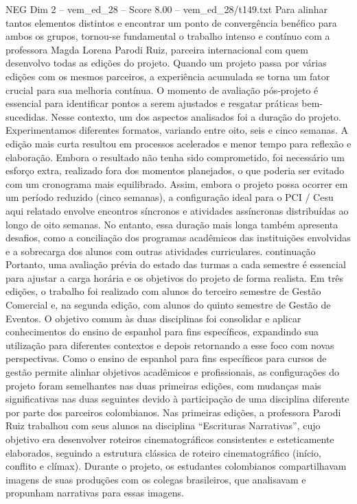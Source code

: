 \begin{textsample}{NEG Dim 2 – vem\_ed\_28 – Score 8.00 – vem\_ed\_28/t149.txt}
Para alinhar tantos elementos distintos e encontrar um ponto de convergência benéfico para ambos os grupos, tornou-se fundamental o trabalho intenso e contínuo com a professora Magda Lorena Parodi Ruiz, parceira internacional com quem desenvolvo todas as edições do projeto.
Quando um projeto passa por várias edições com os mesmos parceiros, a experiência acumulada se torna um fator crucial para sua melhoria contínua.
O momento de avaliação pós-projeto é essencial para identificar pontos a serem ajustados e resgatar práticas bem-sucedidas.
Nesse contexto, um dos aspectos analisados foi a duração do projeto.
Experimentamos diferentes formatos, variando entre oito, seis e cinco semanas.
A edição mais curta resultou em processos acelerados e menor tempo para reflexão e elaboração.
Embora o resultado não tenha sido comprometido, foi necessário um esforço extra, realizado fora dos momentos planejados, o que poderia ser evitado com um cronograma mais equilibrado.
Assim, embora o projeto possa ocorrer em um período reduzido (cinco semanas), a configuração ideal para o PCI / Cesu aqui relatado envolve encontros síncronos e atividades assíncronas distribuídas ao longo de oito semanas.
No entanto, essa duração mais longa também apresenta desafios, como a conciliação dos programas acadêmicos das instituições envolvidas e a sobrecarga dos alunos com outras atividades curriculares. continuação Portanto, uma avaliação prévia do estado das turmas a cada semestre é essencial para ajustar a carga horária e os objetivos do projeto de forma realista.
Em três edições, o trabalho foi realizado com alunos do terceiro semestre de Gestão Comercial e, na segunda edição, com alunos do quinto semestre de Gestão de Eventos.
O objetivo comum às duas disciplinas foi consolidar e aplicar conhecimentos do ensino de espanhol para fins específicos, expandindo sua utilização para diferentes contextos e depois retornando a esse foco com novas perspectivas.
Como o ensino de espanhol para fins específicos para cursos de gestão permite alinhar objetivos acadêmicos e profissionais, as configurações do projeto foram semelhantes nas duas primeiras edições, com mudanças mais significativas nas duas seguintes devido à participação de uma disciplina diferente por parte dos parceiros colombianos.
Nas primeiras edições, a professora Parodi Ruiz trabalhou com seus alunos na disciplina “Escrituras Narrativas”, cujo objetivo era desenvolver roteiros cinematográficos consistentes e esteticamente elaborados, seguindo a estrutura clássica de roteiro cinematográfico (início, conflito e clímax).
Durante o projeto, os estudantes colombianos compartilhavam imagens de suas produções com os colegas brasileiros, que analisavam e propunham narrativas para essas imagens.

\end{textsample}
